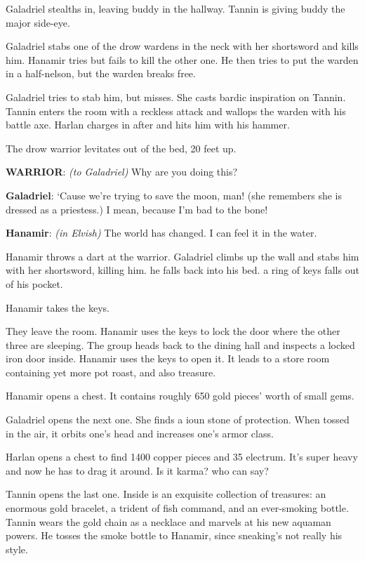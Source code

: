 \documentclass[smalldemyvopaper,11pt,twoside,onecolumn,openright,extrafontsizes]{memoir}
\begin{document}
Galadriel stealths in, leaving buddy in the hallway. Tannin is giving
buddy the major side-eye.

Galadriel stabs one of the drow wardens in the neck with her shortsword
and kills him. Hanamir tries but fails to kill the other one. He then
tries to put the warden in a half-nelson, but the warden breaks free.

Galadriel tries to stab him, but misses. She casts bardic inspiration on
Tannin. Tannin enters the room with a reckless attack and wallops the
warden with his battle axe. Harlan charges in after and hits him with
his hammer.

The drow warrior levitates out of the bed, 20 feet up.

\textbf{WARRIOR}: \emph{(to Galadriel)} Why are you doing this?

\textbf{Galadriel}: `Cause we're trying to save the moon, man! (she
remembers she is dressed as a priestess.) I mean, because I'm bad to the
bone!

\textbf{Hanamir}: \emph{(in Elvish)} The world has changed. I can feel
it in the water.

Hanamir throws a dart at the warrior. Galadriel climbs up the wall and
stabs him with her shortsword, killing him. he falls back into his bed.
a ring of keys falls out of his pocket.

Hanamir takes the keys.

They leave the room. Hanamir uses the keys to lock the door where the
other three are sleeping. The group heads back to the dining hall and
inspects a locked iron door inside. Hanamir uses the keys to open it. It
leads to a store room containing yet more pot roast, and also treasure.

Hanamir opens a chest. It contains roughly 650 gold pieces' worth of
small gems.

Galadriel opens the next one. She finds a ioun stone of protection. When
tossed in the air, it orbits one's head and increases one's armor class.

Harlan opens a chest to find 1400 copper pieces and 35 electrum. It's
super heavy and now he has to drag it around. Is it karma? who can say?

Tannin opens the last one. Inside is an exquisite collection of
treasures: an enormous gold bracelet, a trident of fish command, and an
ever-smoking bottle. Tannin wears the gold chain as a necklace and
marvels at his new aquaman powers. He tosses the smoke bottle to
Hanamir, since sneaking's not really his style.
\end{document}
